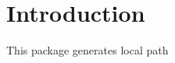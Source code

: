 \hypertarget{index_Introduction}{}\section{Introduction}\label{index_Introduction}
This package generates local path 
